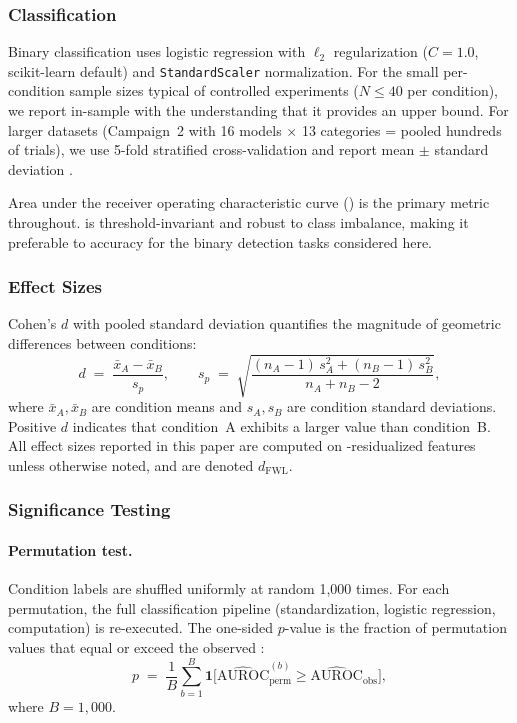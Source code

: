 \subsubsection{Classification}
\label{sec:classification}

Binary classification uses logistic regression with $\ell_2$ regularization ($C = 1.0$, scikit-learn default) and \texttt{StandardScaler} normalization.
For the small per-condition sample sizes typical of controlled experiments ($N \leq 40$ per condition), we report in-sample \auroc with the understanding that it provides an upper bound.
For larger datasets (Campaign~2 with 16 models $\times$ 13 categories = pooled hundreds of trials), we use 5-fold stratified cross-validation and report mean $\pm$ standard deviation \auroc.

Area under the receiver operating characteristic curve (\auroc) is the primary metric throughout.
\auroc is threshold-invariant and robust to class imbalance, making it preferable to accuracy for the binary detection tasks considered here.

\subsubsection{Effect Sizes}

Cohen's $d$ with pooled standard deviation quantifies the magnitude of geometric differences between conditions:
\begin{equation}
  d \;=\; \frac{\bar{x}_A - \bar{x}_B}{s_p}, \qquad
  s_p \;=\; \sqrt{\frac{(n_A - 1)\,s_A^2 + (n_B - 1)\,s_B^2}{n_A + n_B - 2}},
  \label{eq:cohens-d}
\end{equation}
where $\bar{x}_A, \bar{x}_B$ are condition means and $s_A, s_B$ are condition standard deviations.
Positive $d$ indicates that condition~A exhibits a larger value than condition~B.
All effect sizes reported in this paper are computed on \fwl-residualized features unless otherwise noted, and are denoted $d_{\mathrm{FWL}}$.

\subsubsection{Significance Testing}

\paragraph{Permutation test.}
Condition labels are shuffled uniformly at random 1{,}000 times.
For each permutation, the full classification pipeline (standardization, logistic regression, \auroc computation) is re-executed.
The one-sided $p$-value is the fraction of permutation \auroc values that equal or exceed the observed \auroc:
\begin{equation}
  p \;=\; \frac{1}{B}\sum_{b=1}^{B} \mathbf{1}\bigl[\widehat{\mathrm{AUROC}}^{(b)}_{\mathrm{perm}} \geq \widehat{\mathrm{AUROC}}_{\mathrm{obs}}\bigr],
  \label{eq:perm-p}
\end{equation}
where $B = 1{,}000$.

